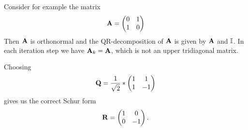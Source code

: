 \begin{SolutionSheet}[\ref{sheet12}]

  \begin{Solution}
	  Consider for example the matrix 
	  \begin{gather*}
		  \mathbf A = \begin{pmatrix}
			  0 & 1 \\
			  1 & 0 
		  \end{pmatrix}
	  \end{gather*}
	Then $\mathbf A$ is orthonormal and the QR-decomposition of $\mathbf A$ is given by $\mathbf A$ and $\mathbb I$.
	  In each iteration step we have $\mathbf A_k = \mathbf A$, which is not an upper tridiagonal matrix.

	  Choosing 
	  \begin{gather*}
		  \mathbf Q = \frac{1}{\sqrt{2}} * \begin{pmatrix}
			  1 & 1 \\
			  1 & -1 
		  \end{pmatrix}
	  \end{gather*}
	  gives us the correct Schur form
	  \begin{gather*}
		  \mathbf R = \begin{pmatrix}
			  1 & 0 \\
			  0 & -1
		  \end{pmatrix}.
	  \end{gather*}

  \end{Solution}

\end{SolutionSheet}


